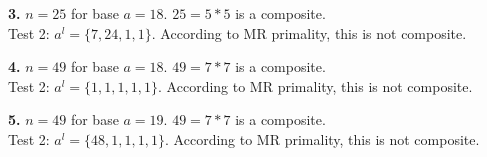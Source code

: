 \documentclass [12pt]{article}
\theoremstyle{definition}
\begin{document}
\phantom{1em} {\bf 3.} $n = 25$ for base $a = 18$. $25 = 5*5$ is a composite. \\
\phantom{1000em} Test 2: $a^{l} = \{7, 24, 1, 1\}$. According to MR primality, this is not composite.

\phantom{1em} {\bf 4.} $n = 49$ for base $a = 18$. $49 = 7*7$ is a composite. \\
\phantom{1000em} Test 2: $a^{l} = \{1, 1, 1, 1, 1\}$. According to MR primality, this is not composite.

\phantom{1em} {\bf 5.} $n = 49$ for base $a = 19$. $49 = 7*7$ is a composite. \\
\phantom{1000em} Test 2: $a^{l} = \{48, 1, 1, 1, 1\}$. According to MR primality, this is not composite.
\end{document}
